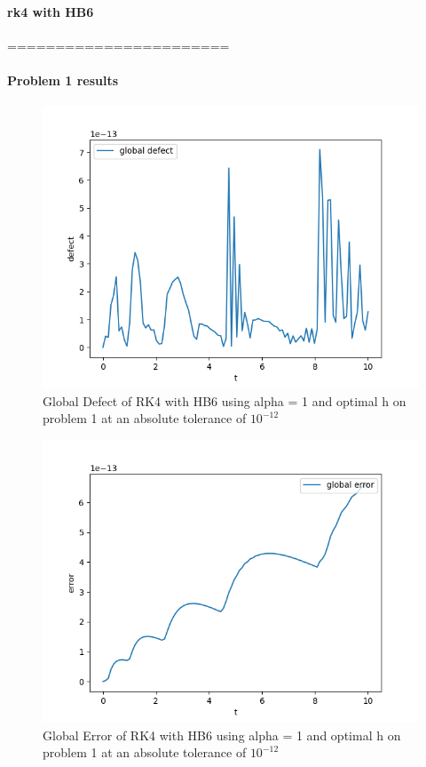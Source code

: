 \documentclass{article}
\begin{document}
\paragraph{rk4 with HB6}
=======================
\paragraph{Problem 1 results}
\begin{figure}[H]
\centering
\includegraphics[width=0.7\linewidth]{./figures/sharp_tolerance_rk4_with_hb6_p1_global_defect}
\caption{Global Defect of RK4 with HB6 using alpha = 1 and optimal h on problem 1 at an absolute tolerance of $10^{-12}$}
\label{fig:sharp_tolerance_rk4_with_hb6_p1_global_defect}
\end{figure}

\begin{figure}[H]
\centering
\includegraphics[width=0.7\linewidth]{./figures/sharp_tolerance_rk4_with_hb6_p1_global_error}
\caption{Global Error of RK4 with HB6 using alpha = 1 and optimal h on problem 1 at an absolute tolerance of $10^{-12}$}
\label{fig:sharp_tolerance_rk4_with_hb6_p1_global_error}
\end{figure}
\end{document}
